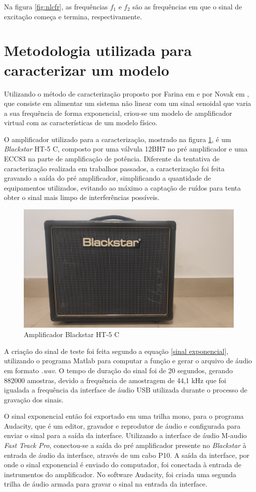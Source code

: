 Na figura \ref{fig:nlcfr}, as frequências $f_{1}$ e $f_{2}$ são as frequências em que o sinal de excitação começa e termina, respectivamente.

\section{Metodologia utilizada para caracterizar um modelo}\label{Metodologia}

Utilizando o método de caracterização proposto por Farina em \cite{farina2001non} e por Novak em \cite{novak2010nonlinear}, que consiste em alimentar um sistema não linear com um sinal senoidal que varia a sua frequência de forma exponencial, criou-se um modelo de amplificador virtual com as características de um modelo físico.

O amplificador utilizado para a caracterização, mostrado na figura \ref{fig:Black}, é um \textit{Blackstar} HT-5 C, composto por uma válvula 12BH7 no pré amplificador e uma ECC83 na parte de amplificação de potência. Diferente da tentativa de caracterização realizada em trabalhos passados, a caracterização foi feita gravando a saída do pré amplificador, simplificando a quantidade de equipamentos utilizados, evitando ao máximo a captação de ruídos para tenta obter o sinal mais limpo de interferências possíveis.

\begin{figure}
	\centering
	\includegraphics[width=0.5 \linewidth]{figuras/Blackstar1}
	\caption{Amplificador Blackstar HT-5 C}
	\label{fig:Black}
\end{figure}

A criação do sinal de teste foi feita segundo a equação \ref{sinal exponencial}, utilizando o programa Matlab para computar a função e gerar o arquivo de áudio em formato \textit{.wav}. O tempo de duração do sinal foi de 20 segundos, gerando 882000 amostras, devido a frequência de amostragem de 44,1 kHz que foi igualada a frequência da interface de áudio USB utilizada durante o processo de gravação dos sinais.


O sinal exponencial então foi exportado em uma trilha mono, para o programa Audacity, que é um editor, gravador e reprodutor de áudio e configurada para enviar o sinal para a saída da interface. Utilizando a interface de áudio M-audio \textit{Fast Track Pro}, conectou-se a saída do pré amplificador presente no \textit{Blackstar} à entrada de áudio da interface, através de um cabo P10. A saída da interface, por onde o sinal exponencial é enviado do computador, foi conectada à entrada de instrumentos do amplificador. No software Audacity, foi criada uma segunda trilha de áudio armada para gravar o sinal na entrada da interface. 


